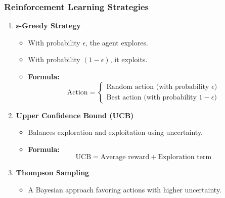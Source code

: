 \documentclass[aspectratio=169]{beamer}
\begin{document}
\begin{frame}[fragile]
    \frametitle{Reinforcement Learning Strategies}
    \begin{enumerate}
        \item \textbf{ε-Greedy Strategy}
            \begin{itemize}
                \item With probability $\epsilon$, the agent explores.
                \item With probability $(1 - \epsilon)$, it exploits.
                \item \textbf{Formula:} 
                \begin{equation}
                \text{Action} = 
                \begin{cases} 
                \text{Random action (with probability } \epsilon) \\ 
                \text{Best action (with probability } 1 - \epsilon) 
                \end{cases}
                \end{equation}
            \end{itemize}
        
        \item \textbf{Upper Confidence Bound (UCB)}
            \begin{itemize}
                \item Balances exploration and exploitation using uncertainty.
                \item \textbf{Formula:}
                \begin{equation}
                \text{UCB} = \text{Average reward} + \text{Exploration term}
                \end{equation}
            \end{itemize}
        
        \item \textbf{Thompson Sampling}
            \begin{itemize}
                \item A Bayesian approach favoring actions with higher uncertainty.
            \end{itemize}
    \end{enumerate}
\end{frame}
\end{document}
